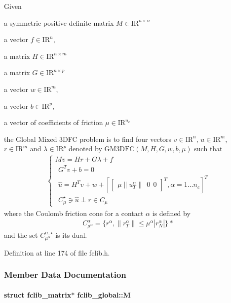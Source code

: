 Given 
\begin{DoxyItemize}
\item a symmetric positive definite matrix ${M} \in {\mathrm{I\!R}}^{n \times n}$ 
\item a vector $ {f} \in {\mathrm{I\!R}}^n$, 
\item a matrix ${H} \in {\mathrm{I\!R}}^{n \times m}$ 
\item a matrix ${G} \in {\mathrm{I\!R}}^{n \times p}$ 
\item a vector $w \in {\mathrm{I\!R}}^{m}$, 
\item a vector $b \in {\mathrm{I\!R}}^{p}$, 
\item a vector of coefficients of friction $\mu \in {\mathrm{I\!R}}^{n_c}$ 
\end{DoxyItemize}the Global Mixed 3\-D\-F\-C problem is to find four vectors $ {v} \in {\mathrm{I\!R}}^n$, $u\in{\mathrm{I\!R}}^m$, $r\in {\mathrm{I\!R}}^m$ and $\lambda \in {\mathrm{I\!R}}^p$ denoted by $\mathrm{GM3DFC}(M,H,G,w,b,\mu)$ such that \begin{eqnarray*} \begin{cases} M v = {H} {r} + G\lambda + {f} \\ \ \ G^T v +b =0 \\ \ \ \hat u = H^T v + w +\left[ \left[\begin{array}{c} \mu \|u^\alpha_T\|\ \ 0 \ \ 0 \end{array}\right]^T, \alpha = 1 \ldots n_c \right]^T \\ \ \ C^\star_{\mu} \ni {\hat u} \perp r \in C_{\mu} \end{cases} \end{eqnarray*} where the Coulomb friction cone for a contact $\alpha$ is defined by \begin{eqnarray*} \label{eq:CCC} C_{\mu^\alpha}^{\alpha} = \{r^\alpha, \|r^\alpha_T \| \leq \mu^\alpha |r^\alpha_N| \} *\end{eqnarray*} and the set $C^{\alpha,\star}_{\mu^\alpha}$ is its dual. 

Definition at line 174 of file fclib.\-h.



\subsubsection{Member Data Documentation}
\hypertarget{structfclib__global_a82538cefd07d0f1f6c1e7baebe768fc6}{
\paragraph[{M}]{\setlength{\rightskip}{0pt plus 5cm}struct {\bf fclib\-\_\-matrix}$\ast$ fclib\-\_\-global\-::\-M}}\label{structfclib__global_a82538cefd07d0f1f6c1e7baebe768fc6}


